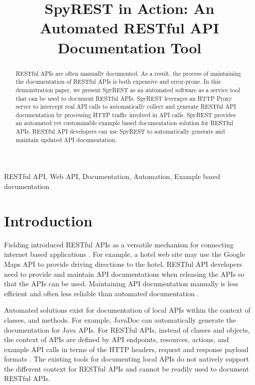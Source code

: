 \documentclass[conference]{IEEEtran}
\begin{document}
\title{SpyREST in Action: An Automated RESTful API Documentation Tool}

\author{
}
\maketitle


\begin{abstract}
RESTful APIs are often manually documented. As a result, the process of maintaining the documentation of RESTful APIs is both expensive and error-prone. In this demonstration paper, we present SpyREST as an automated software as a service tool that can be used to document RESTful APIs. SpyREST leverages an HTTP Proxy server to intercept real API calls to automatically collect and generate RESTful API documentation by processing HTTP traffic involved in API calls. SpyREST provides an automated yet customizable example based documentation solution for RESTful APIs. RESTful API developers can use SpyREST to automatically generate and maintain updated API documentation.

\end{abstract}

\begin{IEEEkeywords}
RESTful API, Web API, Documentation, Automation, Example based documentation
\end{IEEEkeywords}

\IEEEpeerreviewmaketitle

\section{Introduction}
Fielding introduced RESTful APIs as a versatile mechanism for connecting internet based applications \cite{Fielding_rest}. For example, a hotel web site may use the Google Maps API to provide driving directions to the hotel. RESTful API developers need to provide and maintain API documentations when releasing the APIs so that the APIs can be used. Maintaining API documentation manually is less efficient and often less reliable than automated documentation \cite{Espinha_web}.

Automated solutions exist for documentation of local APIs within the context of classes, and methods. For example, JavaDoc can automatically generate the documentation for Java APIs. For RESTful APIs, instead of classes and objects, the context of APIs are defined by API endpoints, resources, actions, and example API calls in terms of the HTTP headers, request and response payload formats \cite{Danielsen_validation}. The existing tools for documenting local APIs do not natively support the different context for RESTful APIs and cannot be readily used to document RESTful APIs.
\end{document}

